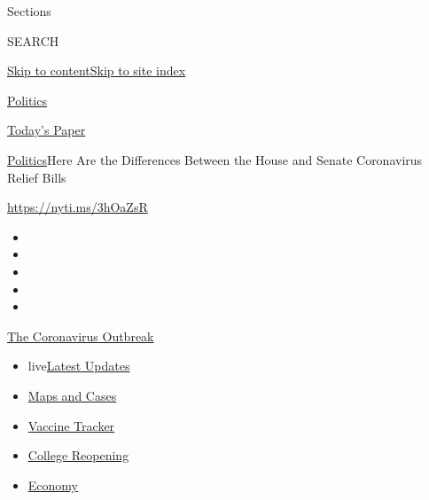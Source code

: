 Sections

SEARCH

\protect\hyperlink{site-content}{Skip to
content}\protect\hyperlink{site-index}{Skip to site index}

\href{https://www.nytimes.com/section/politics}{Politics}

\href{https://myaccount.nytimes.com/auth/login?response_type=cookie\&client_id=vi}{}

\href{https://www.nytimes.com/section/todayspaper}{Today's Paper}

\href{/section/politics}{Politics}\textbar{}Here Are the Differences
Between the House and Senate Coronavirus Relief Bills

\url{https://nyti.ms/3hOaZsR}

\begin{itemize}
\item
\item
\item
\item
\item
\end{itemize}

\href{https://www.nytimes.com/news-event/coronavirus?action=click\&pgtype=Article\&state=default\&region=TOP_BANNER\&context=storylines_menu}{The
Coronavirus Outbreak}

\begin{itemize}
\tightlist
\item
  live\href{https://www.nytimes.com/2020/08/04/world/coronavirus-covid-19.html?action=click\&pgtype=Article\&state=default\&region=TOP_BANNER\&context=storylines_menu}{Latest
  Updates}
\item
  \href{https://www.nytimes.com/interactive/2020/us/coronavirus-us-cases.html?action=click\&pgtype=Article\&state=default\&region=TOP_BANNER\&context=storylines_menu}{Maps
  and Cases}
\item
  \href{https://www.nytimes.com/interactive/2020/science/coronavirus-vaccine-tracker.html?action=click\&pgtype=Article\&state=default\&region=TOP_BANNER\&context=storylines_menu}{Vaccine
  Tracker}
\item
  \href{https://www.nytimes.com/2020/08/02/us/covid-college-reopening.html?action=click\&pgtype=Article\&state=default\&region=TOP_BANNER\&context=storylines_menu}{College
  Reopening}
\item
  \href{https://www.nytimes.com/live/2020/08/03/business/stock-market-today-coronavirus?action=click\&pgtype=Article\&state=default\&region=TOP_BANNER\&context=storylines_menu}{Economy}
\end{itemize}

